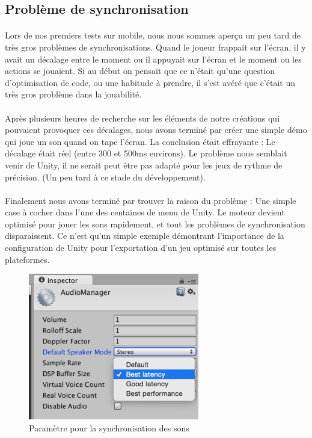 \subsection{Problème de synchronisation}

\paragraph{}
Lors de nos premiers tests sur mobile, nous nous sommes aperçu un peu tard de très gros problèmes de synchronisations.
Quand le joueur frappait sur l'écran, il y avait un décalage entre le moment ou il appuyait sur l'écran et le moment ou les actions se jouaient. Si au début on pensait que ce n'était qu'une question d'optimisation de code, ou une habitude à prendre, il s'est avéré que c'était un très gros problème dans la jouabilité.

\paragraph{}
Après plusieurs heures de recherche sur les éléments de notre créations qui pouvaient provoquer ces décalages, nous avons terminé par créer une simple démo qui joue un son quand on tape l'écran. La conclusion était effrayante : Le décalage était réel (entre 300 et 500ms environs). Le problème nous semblait venir de Unity, il ne serait peut être pas adapté pour les jeux de rythme de précision. (Un peu tard à ce stade du développement).

\paragraph{}
Finalement nous avons terminé par trouver la raison du problème : Une simple case à cocher dans l'une des centaines de menu de Unity. Le moteur devient optimisé pour jouer les sons rapidement, et tout les problèmes de synchronisation disparaissent. Ce n'est qu'un simple exemple démontrant l'importance de la configuration de Unity pour l'exportation d'un jeu optimisé sur toutes les plateformes.

\begin{figure}[H]\centering
  \includegraphics[scale=1]{./img/opti_sound.png}
  \caption{Paramètre pour la synchronisation des sons}
\end{figure}


